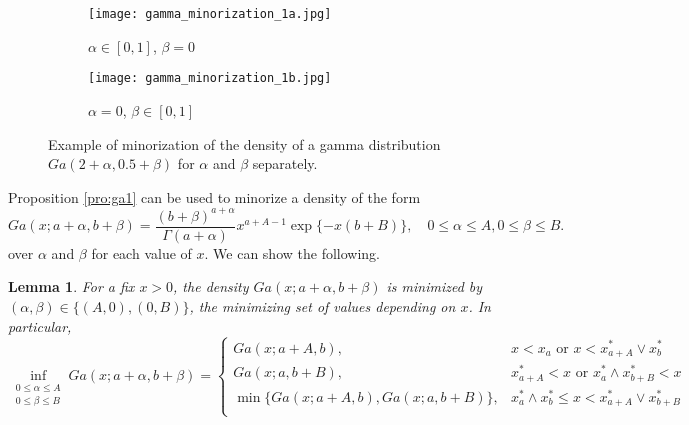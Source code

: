 \documentclass[11pt]{article}
\newtheorem{lemma}{Lemma}[section]
\begin{document}
\begin{figure}
	\centering
	\begin{subfigure}[b]{0.45\textwidth}
		\centering
		\texttt{[image: gamma\_minorization\_1a.jpg]}
		\caption{$\alpha \in [0, 1]$, $\beta=0$}
		\label{fig:gam1a}
	\end{subfigure}
	\hfill
	\begin{subfigure}[b]{0.49\textwidth}
		\centering
		\texttt{[image: gamma\_minorization\_1b.jpg]}
		\caption{$\alpha = 0$, $\beta \in [0, 1]$}
		\label{fig:gam1b}
	\end{subfigure}
	\caption{Example of minorization of the density of a gamma distribution $Ga(2+\alpha, 0.5+\beta)$ for $\alpha$ and $\beta$ separately.}
	\label{fig:gam1}
\end{figure}


Proposition \ref{pro:ga1} can be used to minorize a density of the form
\begin{equation}
	\label{eq:ga}
	Ga(x;a+\alpha,b+\beta) = \frac{(b+\beta)^{a+\alpha}}{\Gamma(a+\alpha)}x^{a+A-1}\exp\{-x(b+B)\}, \quad 0\le\alpha\le A, 0\le\beta\le B.
\end{equation}
over $\alpha$ and $\beta$ for each value of $x$. We can show the following.
\begin{lemma}	
	\label{pro:ga2}
	For a fix $x>0$, the density $Ga(x;a+\alpha,b+\beta)$ is minimized by $(\alpha, \beta) \in \{(A, 0), (0, B)\}$, the minimizing set of values depending on $x$. In particular,	
	$$\inf_{\begin{aligned}
			0\le \alpha\le A \\ 0\le \beta\le B
	\end{aligned}}Ga(x;a+\alpha,b+\beta) = 
	\begin{cases}
		Ga(x;a+A,b)                     , & x<x_a         \text{ or } x<x_{a+A}^* \vee x_b^*\\
		Ga(x;a,b+B)                     , & x_{a+A}^* < x \text{ or } x_a^* \wedge x_{b+B}^* < x\\
		\min\{Ga(x;a+A,b), Ga(x;a,b+B)\}, & x_a^* \wedge x_b^*\le x < x_{a+A}^* \vee x_{b+B}^*\\
	\end{cases}$$
\end{lemma}
\end{document}
